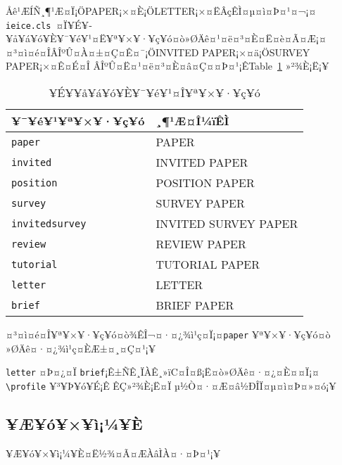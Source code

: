 \documentclass[paper]{ieice}
\def\ClassFile{\texttt{ieice.cls}}
\begin{document}
Åê¹ÆÍÑ¸¶¹Æ¤Ï¡ÖPAPER¡×¤È¡ÖLETTER¡×¤ËÂçÊÌ¤µ¤ì¤Þ¤¹¤¬¡¤
\ClassFile\ ¤Ï¥É¥­¥å¥á¥ó¥È¥¯¥é¥¹¤Ë¥ª¥×¥·¥ç¥ó¤ò»ØÄê¤¹¤ë¤³¤È¤Ë¤è¤Ã¤Æ¡¤
¤³¤ì¤é¤ÎÂÎºÛ¤À¤±¤Ç¤Ê¤¯¡ÖINVITED PAPER¡×¤ä¡ÖSURVEY PAPER¡×¤Ê¤É¤Î
ÂÎºÛ¤Ë¤¹¤ë¤³¤È¤â¤Ç¤­¤Þ¤¹¡ÊTable~\ref{classoption} »²¾È¡Ë¡¥

\begin{table}[tb]
\caption{¥É¥­¥å¥á¥ó¥È¥¯¥é¥¹¤Î¥ª¥×¥·¥ç¥ó}
\label{classoption}
\begin{center}
\begin{tabular}{ll}
\hline
\textbf{¥¯¥é¥¹¥ª¥×¥·¥ç¥ó} & \textbf{¸¶¹Æ¤Î¼ïÊÌ}\\
\hline
\texttt{paper}         & \textsf{PAPER}\\
\texttt{invited}       & \textsf{INVITED PAPER}\\
\texttt{position}      & \textsf{POSITION PAPER}\\
\texttt{survey}        & \textsf{SURVEY PAPER}\\
\texttt{invitedsurvey} & \textsf{INVITED SURVEY PAPER}\\
\texttt{review}        & \textsf{REVIEW PAPER}\\
\texttt{tutorial}      & \textsf{TUTORIAL PAPER}\\
\hline
\texttt{letter}        & \textsf{LETTER}\\
\texttt{brief}         & \textsf{BRIEF PAPER}\\
\hline
\end{tabular}
\end{center}
\end{table}

¤³¤ì¤é¤Î¥ª¥×¥·¥ç¥ó¤ò¾ÊÎ¬¤·¤¿¾ì¹ç¤Ï¡¤\texttt{paper} ¥ª¥×¥·¥ç¥ó¤ò
»ØÄê¤·¤¿¾ì¹ç¤ÈÆ±¤¸¤Ç¤¹¡¥


\texttt{letter} ¤Þ¤¿¤Ï \texttt{brief}¡Ê±ÑÊ¸ÏÀÊ¸»ïC¤Î¤ß¡Ë¤ò»ØÄê¤·¤¿¤È¤­¤Ï¡¤
\verb/\profile/ ¥³¥Þ¥ó¥É¡Ê\pageref{profile:command} ÊÇ»²¾È¡Ë¤Ï
µ­½Ò¤·¤Æ¤â½ÐÎÏ¤µ¤ì¤Þ¤»¤ó¡¥

\subsection{¥Æ¥ó¥×¥ì¡¼¥È}

¥Æ¥ó¥×¥ì¡¼¥È¤Ë½¾¤Ã¤ÆÀâÌÀ¤·¤Þ¤¹¡¥
\end{document}
